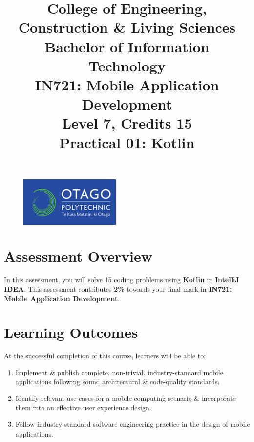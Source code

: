 \documentclass{article}
\author{}
\begin{document}
\begin{figure}
    \centering
    \includegraphics[width=50mm]{../../resources/img/logo.png}
\end{figure}

\title{College of Engineering, Construction \& Living Sciences\\Bachelor of Information Technology\\IN721: Mobile Application Development\\Level 7, Credits 15\\\textbf{Practical 01: Kotlin}}
\date{}
\maketitle

\section*{Assessment Overview}
In this assessment, you will solve 15 coding problems using \textbf{Kotlin} in \textbf{IntelliJ IDEA}. This assessment contributes \textbf{2\%} towards your final mark in \textbf{IN721: Mobile Application Development}.

\section*{Learning Outcomes}
At the successful completion of this course, learners will be able to: 
\begin{enumerate}
	\item Implement \& publish complete, non-trivial, industry-standard mobile applications following sound architectural \& code-quality standards.
	\item Identify relevant use cases for a mobile computing scenario \& incorporate them into an effective user experience design.
	\item Follow industry standard software engineering practice in the design of mobile applications.
\end{enumerate} 
\end{document}
